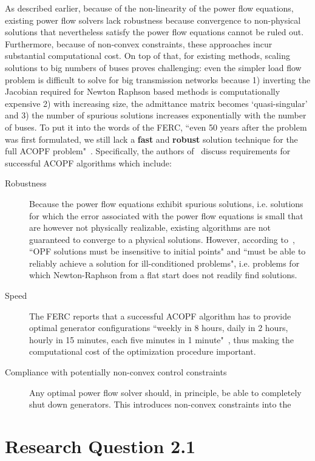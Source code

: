\documentclass[11pt]{cmuthesis} %
\begin{document}
As described earlier, because of the non-linearity of the power flow equations, existing power flow solvers lack robustness because convergence to non-physical solutions that nevertheless satisfy the power flow equations cannot be ruled out. Furthermore, because of non-convex constraints, these approaches incur substantial computational cost. On top of that, for existing methods, scaling solutions to big numbers of buses proves challenging: even the simpler load flow problem is difficult to solve for big transmission networks because 1) inverting the Jacobian required for Newton Raphson based methods is computationally expensive 2) with increasing size, the admittance matrix becomes `quasi-singular' and 3) the number of spurious solutions increases exponentially with the number of buses. To put it into the words of the FERC, ``even 50 years after the problem was first formulated, we still lack a \textbf{fast} and
\textbf{robust} solution technique for the full ACOPF problem"~\cite{cain2012history}. Specifically, the authors of~\cite{frank2012optimal} discuss requirements for successful ACOPF algorithms which include:
\begin{description}
\item[Robustness] Because the power flow equations exhibit spurious solutions, i.e. solutions for which the error associated with the power flow equations is small that are however not physically realizable, existing algorithms are not guaranteed to converge to a physical solutions. However, according to~\cite{frank2012optimal}, ``OPF solutions must be insensitive to initial points" and ``must be able to reliably achieve a solution for ill-conditioned problems", i.e. problems for which Newton-Raphson from a flat start does not readily find solutions.
\item[Speed] The FERC reports that a successful ACOPF algorithm has to provide optimal generator configurations ``weekly in 8 hours, daily in 2 hours, hourly in 15 minutes, each five	minutes in 1 minute"~\cite{cain2012history}, thus making the computational cost of the optimization procedure important.
\item[Compliance with potentially non-convex control constraints] Any optimal power flow solver should, in principle, be able to completely shut down generators. This introduces non-convex constraints into the
\end{description}

\section{Research Question 2.1}
\end{document}
